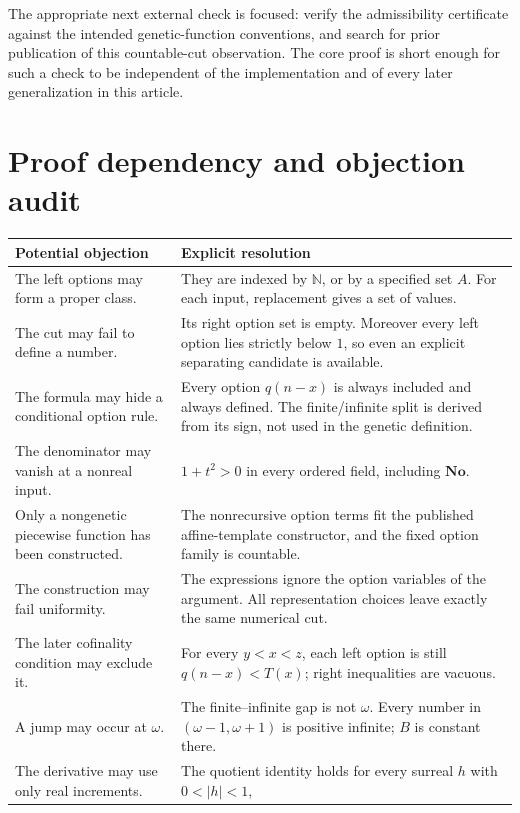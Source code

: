 \documentclass[11pt,letterpaper]{article}
\numberwithin{equation}{section}
\theoremstyle{definition}
\theoremstyle{remark}
\newcommand{\No}{\mathbf{No}}
\newcommand{\N}{\mathbb{N}}
\begin{document}
The appropriate next external check is focused: verify the admissibility
certificate against the intended genetic-function conventions, and search
for prior publication of this countable-cut observation. The core proof
is short enough for such a check to be independent of the implementation
and of every later generalization in this article.

\appendix
\section{Proof dependency and objection audit}\label{app:audit}
\begin{longtable}{@{}p{}p{}@{}}
\toprule
Potential objection & Explicit resolution\\
\midrule
\endhead
The left options may form a proper class.
 & They are indexed by $\N$, or by a specified set $A$. For each input,
 replacement gives a set of values.\\[0.5em]
The cut may fail to define a number.
 & Its right option set is empty. Moreover every left option lies strictly
 below $1$, so even an explicit separating candidate is available.\\[0.5em]
The formula may hide a conditional option rule.
 & Every option $q(n-x)$ is always included and always defined.
 The finite/infinite split is derived from its sign, not used in the
 genetic definition.\\[0.5em]
The denominator may vanish at a nonreal input.
 & $1+t^2>0$ in every ordered field, including $\No$.\\[0.5em]
Only a nongenetic piecewise function has been constructed.
 & The nonrecursive option terms fit the published affine-template
 constructor, and the fixed option family is countable.\\[0.5em]
The construction may fail uniformity.
 & The expressions ignore the option variables of the argument. All
 representation choices leave exactly the same numerical cut.\\[0.5em]
The later cofinality condition may exclude it.
 & For every $y<x<z$, each left option is still $q(n-x)<T(x)$;
 right inequalities are vacuous.\\[0.5em]
A jump may occur at $\omega$.
 & The finite--infinite gap is not $\omega$. Every number in
 $(\omega-1,\omega+1)$ is positive infinite; $B$ is constant there.\\[0.5em]
The derivative may use only real increments.
 & The quotient identity holds for every surreal $h$ with $0<|h|<1$,

\end{longtable}
\end{document}
